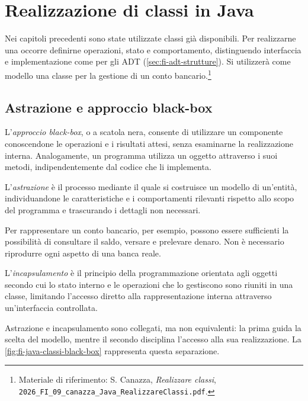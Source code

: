 \chapter{Realizzazione di classi in Java}
\label{chap:realizzazione-classi-java}

Nei capitoli precedenti sono state utilizzate classi già disponibili.
Per realizzarne una occorre definirne operazioni, stato e comportamento,
distinguendo
interfaccia e implementazione come per gli ADT
(\cref{sec:fi-adt-strutture}). Si utilizzerà come modello
una classe per la gestione di un conto bancario.\footnote{Materiale di riferimento: S. Canazza,
\emph{Realizzare classi}, \nolinkurl{2026_FI_09_canazza_Java_RealizzareClassi.pdf}.}

\section{Astrazione e approccio black-box}
\label{sec:fi-java-classi-black-box}

L'\emph{approccio black-box}, o a scatola nera, consente di
utilizzare un componente conoscendone le operazioni e i risultati
attesi, senza esaminarne la realizzazione interna. Analogamente,
un programma utilizza un oggetto attraverso i suoi metodi,
indipendentemente dal codice che li implementa.

\begin{definition}[Astrazione]
\label{def:fi-java-classi-astrazione}
L'\emph{astrazione} è il processo mediante il quale si costruisce
un modello di un'entità, individuandone le caratteristiche e i
comportamenti rilevanti rispetto allo scopo del programma e
trascurando i dettagli non necessari.
\end{definition}

Per rappresentare un conto bancario, per esempio, possono essere
sufficienti la possibilità di consultare il saldo, versare e
prelevare denaro. Non è necessario riprodurre ogni aspetto di una
banca reale.

\begin{definition}[Incapsulamento]
\label{def:fi-java-classi-incapsulamento}
L'\emph{incapsulamento} è il principio della programmazione
orientata agli oggetti secondo cui lo stato interno e le operazioni
che lo gestiscono sono riuniti in una classe, limitando l'accesso
diretto alla rappresentazione interna attraverso un'interfaccia
controllata.
\end{definition}

Astrazione e incapsulamento sono collegati, ma non equivalenti:
la prima guida la scelta del modello, mentre il secondo disciplina
l'accesso alla sua realizzazione. La
\cref{fig:fi-java-classi-black-box} rappresenta questa separazione.

